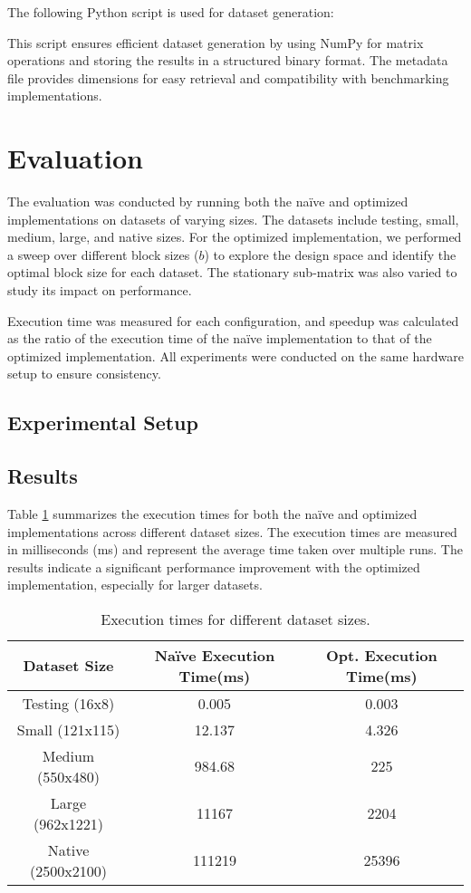 \documentclass[12pt]{article}
\begin{document}
The following Python script is used for dataset generation:


This script ensures efficient dataset generation by using NumPy for matrix operations and storing the results in a structured binary format. The metadata file provides dimensions for easy retrieval and compatibility with benchmarking implementations.

\section{Evaluation}
The evaluation was conducted by running both the naïve and optimized implementations on datasets of varying sizes. The datasets include testing, small, medium, large, and native sizes. For the optimized implementation, we performed a sweep over different block sizes (\( b \)) to explore the design space and identify the optimal block size for each dataset. The stationary sub-matrix was also varied to study its impact on performance.

Execution time was measured for each configuration, and speedup was calculated as the ratio of the execution time of the naïve implementation to that of the optimized implementation. All experiments were conducted on the same hardware setup to ensure consistency.

\subsection{Experimental Setup}


\subsection{Results}
Table \ref{tab:results} summarizes the execution times for both the naïve and optimized implementations across different dataset sizes. The execution times are measured in milliseconds (ms) and represent the average time taken over multiple runs. The results indicate a significant performance improvement with the optimized implementation, especially for larger datasets.

\begin{table}[h]
    \begin{tabular}{|c|c|c|}
        \hline
        \textbf{Dataset Size} & \textbf{Naïve Execution Time(ms)} & \textbf{Opt. Execution Time(ms)} \\
        \hline
        Testing (16x8) & 0.005 & 0.003 \\
        Small (121x115) & 12.137 & 4.326 \\
        Medium (550x480) & 984.68 & 225 \\
        Large (962x1221) & 11167 & 2204 \\
        Native (2500x2100) & 111219 & 25396 \\
        \hline
    \end{tabular}
        \caption{Execution times for different dataset sizes.}
        \label{tab:results}
    \end{table}
\end{document}
